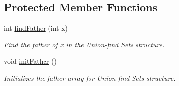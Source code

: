 \subsection*{Protected Member Functions}
\begin{DoxyCompactItemize}
\item 
int \hyperlink{classcmst_1_1_graph2_d_a0b860daa24f288eea5f490e12fcb67e2}{findFather} (int x)
\begin{DoxyCompactList}\small\item\em Find the father of x in the Union-\/find Sets structure. \end{DoxyCompactList}\item 
void \hyperlink{classcmst_1_1_graph2_d_a5de76dfe02b4a13e0d3fe9a5e7ea7285}{initFather} ()
\begin{DoxyCompactList}\small\item\em Initializes the father array for Union-\/find Sets structure. \end{DoxyCompactList}\end{DoxyCompactItemize}
